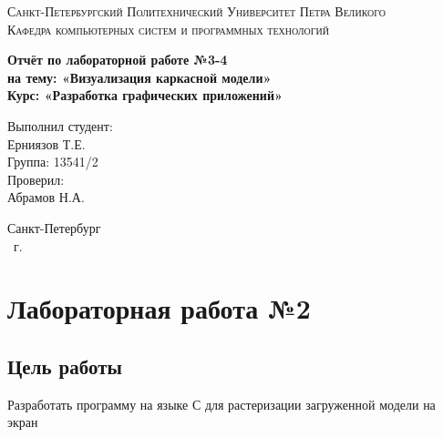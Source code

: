 \documentclass[14pt,a4paper,report]{report}
\begin{document}
\def\contentsname{Содержание}

\begin{titlepage}
\begin{center}
\textsc{Санкт-Петербургский Политехнический 
Университет Петра Великого\\[5mm]
Кафедра компьютерных систем и программных технологий}

\vfill

\textbf{Отчёт по лабораторной работе №3-4\\[3mm]
на тему: «Визуализация каркасной модели»\\[3mm]
Курс: «Разработка графических приложений»\\[41mm]
}
\end{center}

\hfill
\begin{minipage}{.4\textwidth}
Выполнил студент:\\[2mm] 
Ерниязов Т.Е.\\
Группа: 13541/2\\[5mm]

Проверил:\\[2mm] 
Абрамов Н.А.
\end{minipage}
\vfill
\begin{center}
Санкт-Петербург\\ \the\year\ г.
\end{center}
\end{titlepage}

\tableofcontents
\clearpage

\chapter{Лабораторная работа №2}

\section{Цель работы}
Разработать программу на языке С для растеризации загруженной модели на экран
\end{document}
